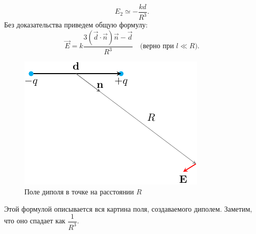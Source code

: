 		\begin{equation}
			E_2\simeq-\frac{kd}{R^3}.
		\end{equation}
		Без доказательства приведем общую формулу:
		\begin{equation}
			\vec{E}=k\frac{3(\vec{d}\cdot\vec{n})\vec{n}-\vec{d}}{R^3} \quad \text{(верно при $l\ll R$)}.
		\end{equation}
		\begin{figure}[h!]
			\label{fig:dipole6}
			\centering
			\includegraphics[scale=1.25]{./img/dipole6/dipole6.pdf}
			\caption{Поле диполя в точке на расстоянии $R$}
		\end{figure}
		Этой формулой описывается вся картина поля, создаваемого диполем. Заметим, что оно спадает как $\dfrac{1}{R^3}$.